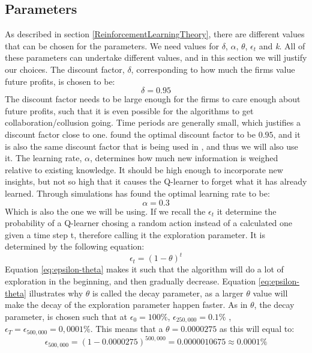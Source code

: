 \documentclass{article}
\begin{document}
\subsection{Parameters}
As described in section \ref{ReinforcementLearningTheory}, there are different values that can be chosen for the parameters. We need values for $\delta$, $\alpha$, $\theta$, $\epsilon_t$ and \textit{k}. All of these parameters can undertake different values, and in this section we will justify our choices.
\newline
The discount factor, $\delta$, corresponding to how much the firms value future profits, is chosen to be: 
$$\delta = 0.95$$
The discount factor needs to be large enough for the firms to care enough about future profits, such that it is even possible for the algorithms to get collaboration/collusion going. Time periods are generally small, which justifies a discount factor close to one. \cite{Klein2021} found the optimal discount factor to be $0.95$, and it is also the same discount factor that is being used in \cite{Calvano}, and thus we will also use it.
\newline
The learning rate, $\alpha$, determines how much new information is weighed relative to existing knowledge. It should be high enough to incorporate new insights, but not so high that it causes the Q-learner to forget what it has already learned. Through simulations \cite{Klein2021} has found the optimal learning rate to be:
$$\alpha = 0.3$$
Which is also the one we will be using.
\newline
If we recall the $\epsilon_t$ it determine the probability of a Q-learner chosing a random action instead of a calculated one given a time step t, therefore calling it the exploration parameter. It is determined by the following equation:
\begin{equation}
\label{eq:epsilon-theta}
    \epsilon_t = (1-\theta)^t 
\end{equation}
Equation \ref{eq:epsilon-theta} makes it such that the algorithm will do a lot of exploration in the beginning, and then gradually decrease. Equation \ref{eq:epsilon-theta} illustrates why $\theta$ is called the decay parameter, as a larger $\theta$ value will make the decay of the exploration parameter happen faster. As in \cite{Klein2021}
$\theta$, the decay parameter, is chosen such that at $\epsilon_0 =100\%$,  $\epsilon_{250,000} =0.1\%$ , $\epsilon_T = \epsilon_{500,000}=0,0001\%$. This means that a $\theta=0.0000275$ as this will equal to: \begin{equation}
    \epsilon_{500,000}= (1-0.0000275)^{500,000}=0.0000010675\approx 0.0001\%
\end{equation} 
\end{document}
